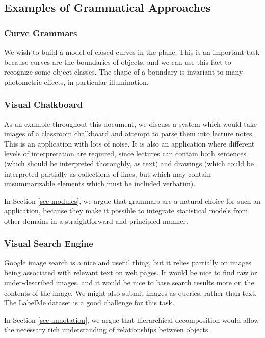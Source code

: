 \documentclass{article}
\begin{document}
\subsection{Examples of Grammatical Approaches}

\subsubsection{Curve Grammars}

We wish to build a model of closed curves in the plane. This is an
important task because curves are the boundaries of objects, and we
can use this fact to recognize some object classes. The shape of a
boundary is invariant to many photometric effects, in particular
illumination. \cite{canny}

\subsubsection{Visual Chalkboard}

As an example throughout this document, we discuss a system which
would take images of a classroom chalkboard and attempt to parse them
into lecture notes. This is an application with lots of noise. It is
also an application where different levels of interpretation are
required, since lectures can contain both sentences (which should be
interpreted thoroughly, as text) and drawings (which could be
interpreted partially as collections of lines, but which may contain
unsummarizable elements which must be included verbatim).

In Section \ref{sec-modules}, we argue that grammars are a natural
choice for such an application, because they make it possible to
integrate statistical models from other domains in a straightforward
and principled manner.

\subsubsection{Visual Search Engine}

Google image search is a nice and useful thing, but it relies
partially on images being associated with relevant text on web
pages. It would be nice to find raw or under-described images, and it
would be nice to base search results more on the contents of the
image. We might also submit images as queries, rather than text. The
LabelMe dataset is a good challenge for this task.

In Section \ref{sec-annotation}, we argue that hierarchical
decomposition would allow the necessary rich understanding of
relationships between objects.
\end{document}
